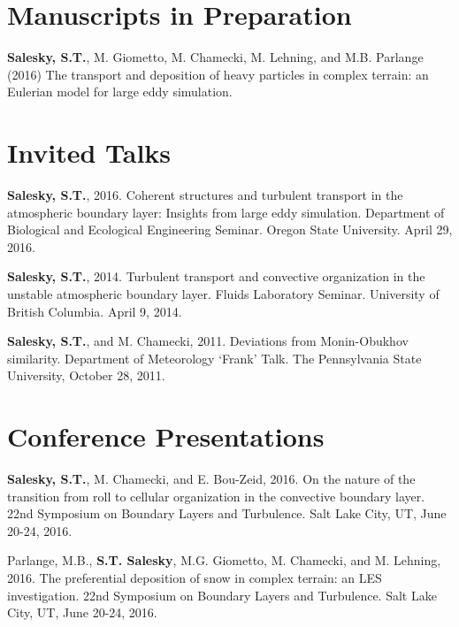 \documentclass[11pt,letterpaper]{article}
\begin{document}
\section*{Manuscripts in Preparation} 
\textbf{Salesky, S.T.}, M. Giometto, M. Chamecki, M. Lehning, and M.B. Parlange (2016) 
The transport and deposition of heavy particles in complex terrain: an Eulerian model
for large eddy simulation.

\section*{Invited Talks} 

\textbf{Salesky, S.T.}, 2016. Coherent structures and turbulent transport in the atmospheric boundary layer: Insights 
from large eddy simulation. Department of Biological and Ecological Engineering Seminar. Oregon State University. 
April 29, 2016.

\textbf{Salesky, S.T.}, 2014. Turbulent transport and convective organization in the unstable atmospheric boundary layer. Fluids Laboratory Seminar. University of British Columbia. April 9, 2014. 

\textbf{Salesky, S.T.}, and M. Chamecki, 2011. Deviations from Monin-Obukhov similarity. Department of Meteorology `Frank' Talk. The Pennsylvania State University, October 28, 2011. 

\section*{Conference Presentations} 


\textbf{Salesky, S.T.}, M. Chamecki, and E. Bou-Zeid, 2016. On the nature of the
transition from roll to cellular organization in the convective boundary layer.
22nd Symposium on Boundary Layers and Turbulence. Salt Lake City, UT, June
20-24, 2016.

Parlange, M.B., \textbf{S.T. Salesky}, M.G. Giometto, M. Chamecki, and M.
Lehning, 2016.  The preferential deposition of snow in complex terrain: an LES
investigation.  22nd Symposium on Boundary Layers and Turbulence. Salt Lake
City, UT, June 20-24, 2016.
\end{document}

